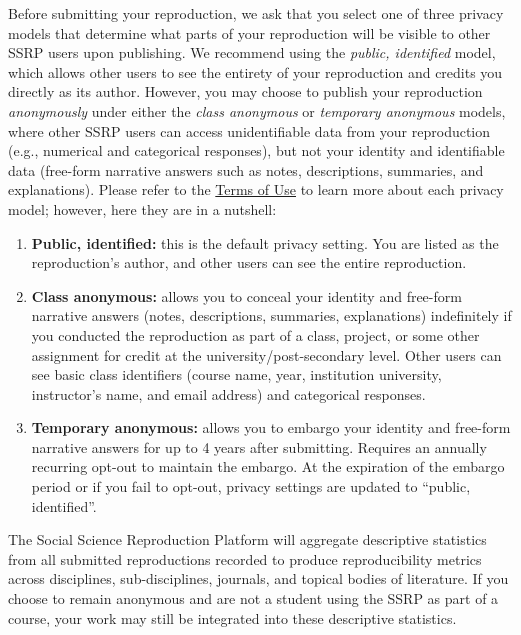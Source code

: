 \documentclass[
]{book}
\begin{document}
Before submitting your reproduction, we ask that you select one of three privacy models that determine what parts of your reproduction will be visible to other SSRP users upon publishing. We recommend using the \emph{public, identified} model, which allows other users to see the entirety of your reproduction and credits you directly as its author. However, you may choose to publish your reproduction \emph{anonymously} under either the \emph{class anonymous} or \emph{temporary anonymous} models, where other SSRP users can access unidentifiable data from your reproduction (e.g., numerical and categorical responses), but not your identity and identifiable data (free-form narrative answers such as notes, descriptions, summaries, and explanations). Please refer to the \href{https://www.socialsciencereproduction.org/terms-of-use}{Terms of Use} to learn more about each privacy model; however, here they are in a nutshell:

\begin{enumerate}
\def\labelenumi{\arabic{enumi}.}
\item
  \textbf{Public, identified:} this is the default privacy setting. You are listed as the reproduction's author, and other users can see the entire reproduction.
\item
  \textbf{Class anonymous:} allows you to conceal your identity and free-form narrative answers (notes, descriptions, summaries, explanations) indefinitely if you conducted the reproduction as part of a class, project, or some other assignment for credit at the university/post-secondary level. Other users can see basic class identifiers (course name, year, institution university, instructor's name, and email address) and categorical responses.
\item
  \textbf{Temporary anonymous:} allows you to embargo your identity and free-form narrative answers for up to 4 years after submitting. Requires an annually recurring opt-out to maintain the embargo. At the expiration of the embargo period or if you fail to opt-out, privacy settings are updated to ``public, identified''.
\end{enumerate}

The Social Science Reproduction Platform will aggregate descriptive statistics from all submitted reproductions recorded to produce reproducibility metrics across disciplines, sub-disciplines, journals, and topical bodies of literature. If you choose to remain anonymous and are not a student using the SSRP as part of a course, your work may still be integrated into these descriptive statistics.
\end{document}
